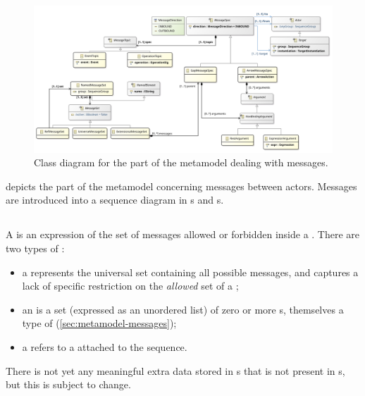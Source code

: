 \begin{figure}
	\centering
	\includegraphics[width=\textwidth]{diagrams/Messages}
	\caption{Class diagram for the part of the \langname{} metamodel dealing with messages.}
	\label{fig:metamodel-messages}
\end{figure}

 depicts the part of the metamodel concerning
messages between actors.  Messages are introduced into a sequence diagram
in \mmessageset s and \marrowaction s.

\subsection{\mmessageset}\label{ssec:metamodel-messages-sets}

A \mmessageset{} is an expression of the set of messages allowed or forbidden
inside a \msequencegap.  There are two types of \mmessageset:

\begin{itemize}
\item
  a \muniversemessageset{} represents the universal set containing 
  all possible messages, and
  captures a lack of specific restriction on
  the \emph{allowed} set of a \msequencegap;
\item	
  an \mextensionalmessageset{} is a set (expressed as an unordered list) of
  zero or more \mgapmessagespec s, themselves
  a type of \mmessagespec{} (\cref{sec:metamodel-messages});
\item
  a \mrefmessageset{} refers to a \mnamedmessageset{} attached to the
  sequence.
\end{itemize}

There is not yet any meaningful extra data stored in
\mgapmessagespec s that is not present in \mmessagespec s, but this is subject
to change.

